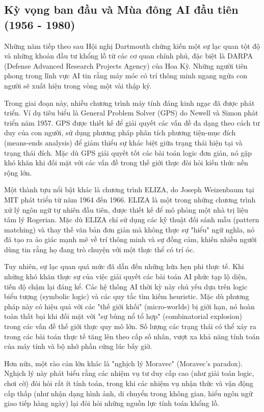 \documentclass[12pt,a4paper]{article}
\begin{document}
\newpage

\subsection{Kỳ vọng ban đầu và Mùa đông AI đầu tiên (1956 - 1980)}

Những năm tiếp theo sau Hội nghị Dartmouth chứng kiến một sự lạc quan tột độ và những khoản đầu tư khổng lồ từ các cơ quan chính phủ, đặc biệt là DARPA (Defense Advanced Research Projects Agency) của Hoa Kỳ. Những người tiên phong trong lĩnh vực AI tin rằng máy móc có trí thông minh ngang ngửa con người sẽ xuất hiện trong vòng một vài thập kỷ.

Trong giai đoạn này, nhiều chương trình máy tính đáng kinh ngạc đã được phát triển. Ví dụ tiêu biểu là General Problem Solver (GPS) do Newell và Simon phát triển năm 1957. GPS được thiết kế để giải quyết các vấn đề đa dạng theo cách tư duy của con người, sử dụng phương pháp phân tích phương tiện-mục đích (means-ends analysis) để giảm thiểu sự khác biệt giữa trạng thái hiện tại và trạng thái đích. Mặc dù GPS giải quyết tốt các bài toán logic đơn giản, nó gặp khó khăn khi đối mặt với các vấn đề trong thế giới thực đòi hỏi kiến thức nền rộng lớn.

Một thành tựu nổi bật khác là chương trình ELIZA, do Joseph Weizenbaum tại MIT phát triển từ năm 1964 đến 1966. ELIZA là một trong những chương trình xử lý ngôn ngữ tự nhiên đầu tiên, được thiết kế để mô phỏng một nhà trị liệu tâm lý Rogerian. Mặc dù ELIZA chỉ sử dụng các kỹ thuật đối sánh mẫu (pattern matching) và thay thế văn bản đơn giản mà không thực sự "hiểu" ngữ nghĩa, nó đã tạo ra ảo giác mạnh mẽ về trí thông minh và sự đồng cảm, khiến nhiều người dùng tin rằng họ đang trò chuyện với một thực thể có trí óc.

Tuy nhiên, sự lạc quan quá mức đã dẫn đến những hứa hẹn phi thực tế. Khi những khó khăn thực sự của việc giải quyết các bài toán AI phức tạp lộ diện, tiến độ chậm lại đáng kể. Các hệ thống AI thời kỳ này chủ yếu dựa trên logic biểu tượng (symbolic logic) và các quy tắc tìm kiếm heuristic. Mặc dù phương pháp này có hiệu quả với các "thế giới khối" (micro-worlds) bị giới hạn, nó hoàn toàn thất bại khi đối mặt với "sự bùng nổ tổ hợp" (combinatorial explosion) trong các vấn đề thế giới thực quy mô lớn. Số lượng các trạng thái có thể xảy ra trong các bài toán thực tế tăng lên theo cấp số nhân, vượt xa khả năng tính toán của máy tính và bộ nhớ phần cứng lúc bấy giờ.

Hơn nữa, một rào cản lớn khác là "nghịch lý Moravec" (Moravec's paradox). Nghịch lý này phát biểu rằng các nhiệm vụ tư duy cấp cao (như giải toán logic, chơi cờ) đòi hỏi rất ít tính toán, trong khi các nhiệm vụ nhận thức và vận động cấp thấp (như nhận dạng hình ảnh, di chuyển trong không gian, hiểu ngôn ngữ giao tiếp hàng ngày) lại đòi hỏi những nguồn lực tính toán khổng lồ. 
\end{document}
